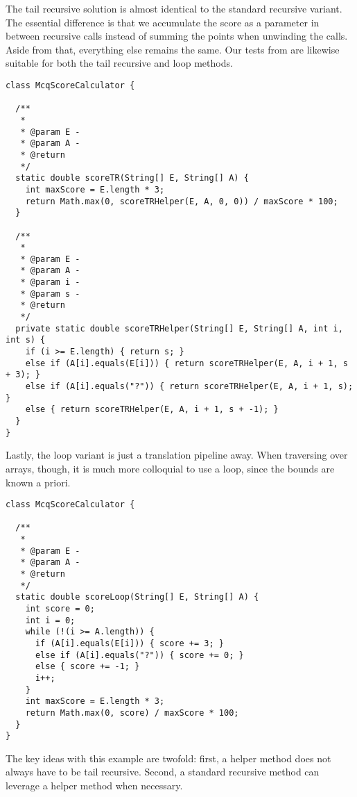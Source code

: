 The tail recursive solution is almost identical to the standard recursive variant. The essential difference is that we accumulate the score as a parameter in between recursive calls instead of summing the points when unwinding the calls. Aside from that, everything else remains the same. Our tests from  are likewise suitable for both the tail recursive and loop methods.

\begin{cl}[]{}
\begin{lstlisting}[language=MyJava]
class McqScoreCalculator {

  /**
   *
   * @param E - 
   * @param A - 
   * @return
   */
  static double scoreTR(String[] E, String[] A) {
    int maxScore = E.length * 3;
    return Math.max(0, scoreTRHelper(E, A, 0, 0)) / maxScore * 100;
  }

  /**
   *
   * @param E - 
   * @param A - 
   * @param i - 
   * @param s - 
   * @return
   */
  private static double scoreTRHelper(String[] E, String[] A, int i, int s) {
    if (i >= E.length) { return s; }
    else if (A[i].equals(E[i])) { return scoreTRHelper(E, A, i + 1, s + 3); }
    else if (A[i].equals("?")) { return scoreTRHelper(E, A, i + 1, s); }
    else { return scoreTRHelper(E, A, i + 1, s + -1); }
  }
}
\end{lstlisting}
\end{cl}

Lastly, the loop variant is just a translation pipeline away. When traversing over arrays, though, it is much more colloquial to use a  loop, since the bounds are known a priori.

\begin{cl}[]{}
\begin{lstlisting}[language=MyJava]
class McqScoreCalculator {

  /**
   *
   * @param E - 
   * @param A - 
   * @return
   */
  static double scoreLoop(String[] E, String[] A) {
    int score = 0;
    int i = 0;
    while (!(i >= A.length)) {
      if (A[i].equals(E[i])) { score += 3; } 
      else if (A[i].equals("?")) { score += 0; } 
      else { score += -1; }
      i++;
    }
    int maxScore = E.length * 3;
    return Math.max(0, score) / maxScore * 100;
  }
}
\end{lstlisting}
\end{cl}

The key ideas with this example are twofold: first, a helper method does not always have to be tail recursive. Second, a standard recursive method can leverage a helper method when necessary.

